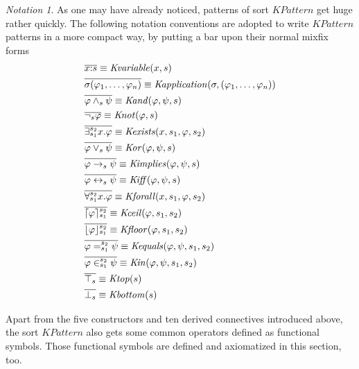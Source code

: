\documentclass[UTF8,11pt]{article}
\newcounter{thmcounter}
\theoremstyle{plain}
\theoremstyle{definition}
\theoremstyle{remark}
\newtheorem{notation}   [thmcounter]{Notation}
\newcommand{\cln}{{:}}
\DeclarePairedDelimiter{\ceil}{\lceil}{\rceil}
\DeclarePairedDelimiter{\floor}{\lfloor}{\rfloor}
\newcommand{\KPattern}{\mathit{KPattern}}
\newcommand{\Kvariable}{\mathit{Kvariable}}
\newcommand{\Kand}{\mathit{Kand}}
\newcommand{\Kor}{\mathit{Kor}}
\newcommand{\Kimplies}{\mathit{Kimplies}}
\newcommand{\Kiff}{\mathit{Kiff}}
\newcommand{\Knot}{\mathit{Knot}}
\newcommand{\Kapplication}{\mathit{Kapplication}}
\newcommand{\Kexists}{\mathit{Kexists}}
\newcommand{\Kforall}{\mathit{Kforall}}
\newcommand{\Kequals}{\mathit{Kequals}}
\newcommand{\Kin}{\mathit{Kin}}
\newcommand{\Ktop}{\mathit{Ktop}}
\newcommand{\Kbottom}{\mathit{Kbottom}}
\newcommand{\Kfloor}{\mathit{Kfloor}}
\newcommand{\Kceil}{\mathit{Kceil}}
\begin{document}
\begin{notation}
	As one may have already noticed, patterns of sort $\KPattern$ get huge rather quickly.
	The following notation conventions are adopted to write $\KPattern$ patterns in a more compact way, by putting a bar upon their normal mixfix forms
	\begin{align*}
	  & \overline{x \cln s} \equiv \Kvariable(x, s)
	  \\
	  & \overline{\sigma(\varphi_1, \dots, \varphi_n)} \equiv \Kapplication(\sigma, (\varphi_1, \dots, \varphi_n))
	  \\
	  & \overline{\varphi \wedge_s \psi} \equiv \Kand(\varphi, \psi, s)
	  \\
	  & \overline{\neg_s \varphi} \equiv \Knot(\varphi, s)
	  \\
	  & \overline{\exists_{s_1}^{s_2} x . \varphi} \equiv \Kexists(x, s_1, \varphi, s_2)
	  \\
	  & \overline{\varphi \vee_s \psi} \equiv \Kor(\varphi, \psi, s)
	  \\
	  & \overline{\varphi \to_s \psi} \equiv \Kimplies(\varphi, \psi, s)
	  \\
	  & \overline{\varphi \leftrightarrow_s \psi} \equiv \Kiff(\varphi, \psi, s)
	  \\
	  & \overline{\forall_{s_1}^{s_2} x . \varphi} \equiv \Kforall(x, s_1, \varphi, s_2)
      \\
      & \overline{\ceil{\varphi}_{s_1}^{s_2}} \equiv \Kceil(\varphi, s_1, s_2)
      \\
      & \overline{\floor{\varphi}_{s_1}^{s_2}} \equiv \Kfloor(\varphi, s_1, s_2)
      \\
      & \overline{\varphi =_{s_1}^{s_2} \psi} \equiv \Kequals(\varphi, \psi, s_1, s_2)
      \\
      & \overline{\varphi \in_{s_1}^{s_2} \psi} \equiv \Kin(\varphi, \psi, s_1, s_2)
      \\
      & \overline{\top_s} \equiv \Ktop(s)
      \\
      & \overline{\bot_s} \equiv \Kbottom(s)
	\end{align*}
\end{notation}

Apart from the five constructors and ten derived connectives introduced above, the sort $\KPattern$ also gets some common operators defined as functional symbols.
Those functional symbols are defined and axiomatized in this section, too.
\end{document}
